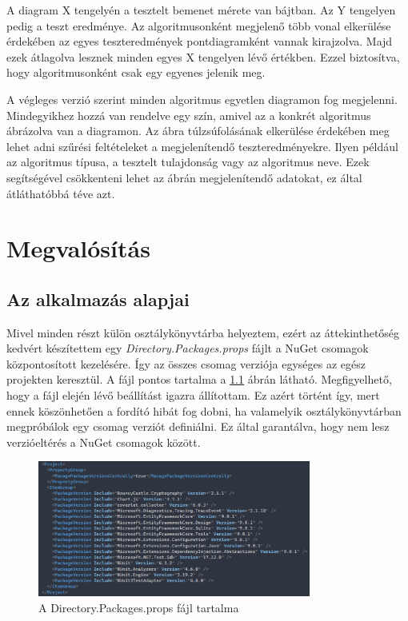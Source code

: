\documentclass[12pt]{report} %
\begin{document}
A diagram X tengelyén a tesztelt bemenet mérete van bájtban. Az Y tengelyen pedig a teszt eredménye. Az algoritmusonként megjelenő több vonal elkerülése érdekében az egyes teszteredmények pontdiagramként vannak kirajzolva. Majd ezek átlagolva lesznek minden egyes X tengelyen lévő értékben. Ezzel biztosítva, hogy algoritmusonként csak egy egyenes jelenik meg.

A végleges verzió szerint minden algoritmus egyetlen diagramon fog megjelenni. Mindegyikhez hozzá van rendelve egy szín, amivel az a konkrét algoritmus ábrázolva van a diagramon. Az ábra túlzsúfolásának elkerülése érdekében meg lehet adni szűrési feltételeket a megjelenítendő teszteredményekre. Ilyen például az algoritmus típusa, a tesztelt tulajdonság vagy az algoritmus neve. Ezek segítségével csökkenteni lehet az ábrán megjelenítendő adatokat, ez által átláthatóbbá téve azt.

\chapter{Megvalósítás} %

\section{Az alkalmazás alapjai} %

Mivel minden részt külön osztálykönyvtárba helyeztem, ezért az áttekinthetőség kedvért készítettem egy \textit{Directory.Packages.props} fájlt a NuGet csomagok központosított kezelésére. Így az összes csomag verziója egységes az egész projekten keresztül. A fájl pontos tartalma a \ref{fig:Implementation1} ábrán látható. Megfigyelhető, hogy a fájl elején lévő beállítást igazra állítottam. Ez azért történt így, mert ennek köszönhetően a fordító hibát fog dobni, ha valamelyik osztálykönyvtárban megpróbálok egy csomag verziót definiálni. Ez által garantálva, hogy nem lesz verzióeltérés a NuGet csomagok között.

\begin{figure}[H]
    \centering %
    \includegraphics[width=0.8\textwidth]{Figures/Implementation1.png} %
    \caption{A Directory.Packages.props fájl tartalma} %
    \label{fig:Implementation1} %
\end{figure}
\end{document}
